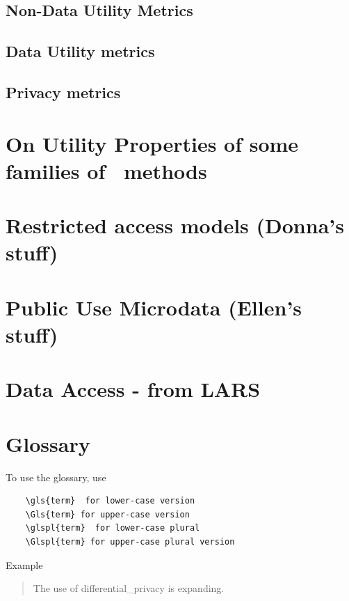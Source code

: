 \documentclass[12pt]{article}
\begin{document}
\subsection{Non-Data Utility Metrics}\label{sec:other_metrics}


\subsection{Data Utility metrics} \label{du_metrics}


\subsection{Privacy metrics}\label{sec:privacy_metrics}



\section{On Utility Properties of some families of \SDL\ methods}
\label{subsec.simulateddata}



 
\section{Restricted access models (Donna's stuff)}


\section{Public Use Microdata (Ellen's stuff)}



\section{Data Access - from LARS}


%
%
%
\printbibliography[]

\section*{Glossary}
To use the glossary, use 
\begin{verbatim}
    \gls{term}  for lower-case version
    \Gls{term} for upper-case version
    \glspl{term}  for lower-case plural
    \Glspl{term} for upper-case plural version
\end{verbatim}
Example
\begin{quote}
    The use of \gls{differential_privacy} is expanding.
\end{quote}

\printglossary
\end{document}
